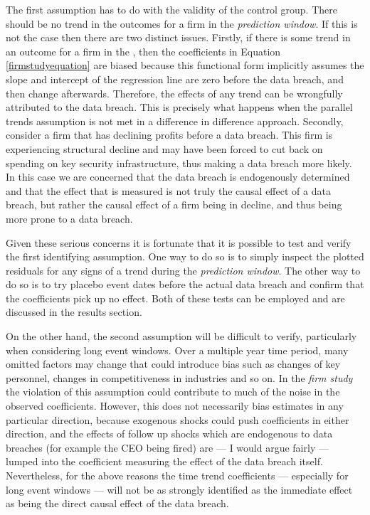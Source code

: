 \documentclass[../Main.tex]{subfiles}
\begin{document}
The first assumption has to do with the validity of the control group. There should be no trend in the outcomes for a firm in the \textit{prediction window}. If this is not the case then there are two distinct issues. Firstly, if there is some trend in an outcome for a firm in the , then the coefficients in Equation \ref{firmstudyequation} are biased because this functional form implicitly assumes the slope and intercept of the regression line are zero before the data breach, and then change afterwards. Therefore, the effects of any trend can be wrongfully attributed to the data breach. This is precisely what happens when the parallel trends assumption is not met in a difference in difference approach. Secondly, consider a firm that has declining profits before a data breach. This firm is experiencing structural decline and may have been forced to cut back on spending on key security infrastructure, thus making a data breach more likely. In this case we are concerned that the data breach is endogenously determined and that the effect that is measured is not truly the causal effect of a data breach, but rather the causal effect of a firm being in decline, and thus being more prone to a data breach. 

Given these serious concerns it is fortunate that it is possible to test and verify the first identifying assumption. One way to do so is to simply inspect the plotted residuals for any signs of a trend during the \textit{prediction window}. The other way to do so is to try placebo event dates before the actual data breach and confirm that the coefficients pick up no effect. Both of these tests can be employed and are discussed in the results section. 

On the other hand, the second assumption will be difficult to verify, particularly when considering long event windows. Over a multiple year time period, many omitted factors may change that could introduce bias such as changes of key personnel, changes in competitiveness in industries and so on. In the \textit{firm study} the violation of this assumption could contribute to much of the noise in the observed coefficients. However, this does not necessarily bias estimates in any particular direction, because exogenous shocks could push coefficients in either direction, and the effects of follow up shocks which are endogenous to data breaches (for example the CEO being fired) are --- I would argue fairly --- lumped into the coefficient measuring the effect of the data breach itself. Nevertheless, for the above reasons the time trend coefficients --- especially for long event windows --- will not be as strongly identified as the immediate effect as being the direct causal effect of the data breach.
\end{document}
